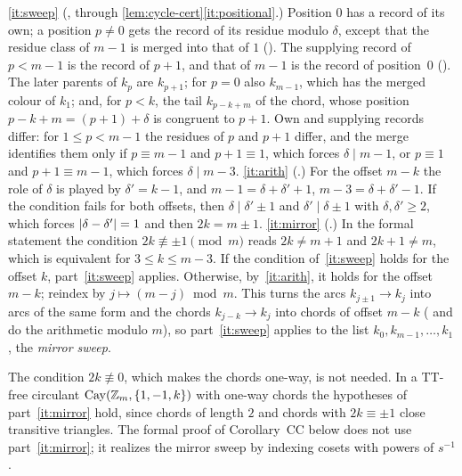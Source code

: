 \begin{outline}
\ref{it:sweep} (, through \cref{lem:cycle-cert}\ref{it:positional}.) Position $0$ has a record of
its own; a position $p\ne0$ gets the record of its residue modulo $\delta$, except that the residue class of $m-1$ is merged
into that of $1$ (). The supplying record of $p<m-1$ is the record of $p+1$, and that of $m-1$ is the record
of position~$0$ (). The later parents of $k_p$ are $k_{p+1}$; for $p=0$ also $k_{m-1}$, which has the merged
colour of $k_1$; and, for $p<k$, the tail $k_{p-k+m}$ of the chord, whose position $p-k+m=(p+1)+\delta$ is congruent to
$p+1$. Own and supplying records differ: for $1\le p<m-1$ the residues of $p$ and $p+1$ differ, and the merge identifies
them only if $p\equiv m-1$ and $p+1\equiv1$, which forces $\delta\mid m-1$, or $p\equiv1$ and $p+1\equiv m-1$, which
forces $\delta\mid m-3$.
\ref{it:arith} (.) For the offset $m-k$ the role of $\delta$ is played by $\delta'=k-1$, and
$m-1=\delta+\delta'+1$, $m-3=\delta+\delta'-1$. If the condition fails for both offsets, then $\delta\mid\delta'\pm1$ and
$\delta'\mid\delta\pm1$ with $\delta,\delta'\ge2$, which forces $\lvert \delta-\delta' \rvert=1$ and then $2k=m\pm1$.
\ref{it:mirror} (.) In the formal statement the condition $2k\not\equiv\pm1\pmod m$ reads
$2k\ne m+1$ and $2k+1\ne m$, which is equivalent for $3\le k\le m-3$. If the condition of~\ref{it:sweep} holds for the
offset $k$, part~\ref{it:sweep} applies. Otherwise, by~\ref{it:arith}, it holds for the offset $m-k$; reindex by
$j\mapsto(m-j)\bmod m$. This turns the arcs $k_{j\pm1}\to k_j$ into arcs of the same form and the chords $k_{j-k}\to k_j$
into chords of offset $m-k$ ( and  do the arithmetic modulo $m$), so
part~\ref{it:sweep} applies to the list $k_0,k_{m-1},\dots,k_1$, the \emph{mirror sweep}.
\end{outline}

The condition $2k\not\equiv0$, which makes the chords one-way, is not needed. In a TT-free circulant
$\operatorname{Cay}(\mathbb{Z}_m,\{1,-1,k\})$ with one-way chords the hypotheses of part~\ref{it:mirror} hold, since chords of length $2$ and
chords with $2k\equiv\pm1$ close transitive triangles. The formal proof of Corollary~CC below does not use
part~\ref{it:mirror}; it realizes the mirror sweep by indexing cosets with powers of $s^{-1}$.


